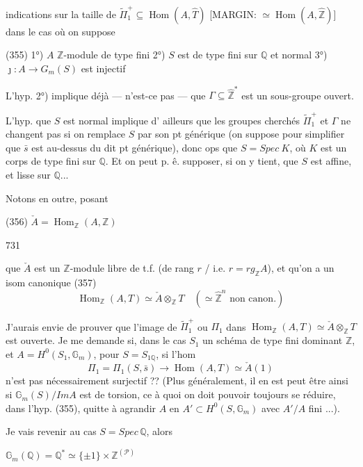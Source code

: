 indications sur la taille de $\tilde{\Pi}_1^+ \subseteq \operatorname{Hom}(A, \hat{T})$
[MARGIN: $\simeq \operatorname{Hom}(A, \hat{\mathbb{Z}})$]
dans le cas où on suppose

(355)
1°) $A$ $\mathbb{Z}$-module de type fini
2°) $S$ est de type fini sur $\mathbb{Q}$ et normal
3°) $\jmath : A \longrightarrow G_m(S)$ est injectif

L'hyp. 2°) implique déjà — n'est-ce pas —
que $\Gamma \subseteq \hat{\mathbb{Z}}^*$ est un sous-groupe ouvert.

L'hyp. que $S$ est normal implique d'
ailleurs que les groupes cherchés
$\tilde{\Pi}_1^+$ et $\Gamma$ ne changent pas si on remplace
$S$ par son pt générique (on suppose
pour simplifier que $\bar{s}$ est au-dessus du
dit pt générique), donc ops que
$S = Spec \ K$, où $K$ est un corps de
type fini sur $\mathbb{Q}$. Et on peut p. ê.
supposer, si on y tient, que $S$
est affine, et lisse sur $\mathbb{Q}$...

Notons en outre, posant

(356) $\check{A} = \operatorname{Hom}_{\mathbb{Z}}(A, \mathbb{Z})$

\newpage


731

que $\check{A}$ est un $\mathbb{Z}$-module libre de t.f.
(de rang $r$ / i.e. $r = rg_{\mathbb{Z}} A$), et qu'on a
un isom canonique
(357) $$ \operatorname{Hom}_{\mathbb{Z}}(A, T) \simeq \check{A} \otimes_{\mathbb{Z}} T \quad (\simeq \hat{\mathbb{Z}}^n \text{ non canon.}) $$

J'aurais envie de prouver que l'image
de $\tilde{\Pi}_1^+$ ou $\Pi_1$ dans $\operatorname{Hom}_{\mathbb{Z}}(A, T) \simeq \check{A} \otimes_{\mathbb{Z}} T$
est ouverte. Je me demande si,
dans le cas $S_1$ un schéma de type fini
dominant $\mathbb{Z}$,
et $A = H^0(S_1, \mathbb{G}_m)$, pour
$S = S_{1\mathbb{Q}}$, si l'hom
$$\Pi_1 = \Pi_1(S, \bar{s}) \to \operatorname{Hom}(A, T) \simeq \check{A}(1)$$
n'est pas nécessairement surjectif ??
(Plus généralement, il en est peut être
ainsi si $\mathbb{G}_m(S) / Im A$ est de
torsion, ce à quoi on doit pouvoir
toujours se réduire, dans l'hyp. (355), quitte
à agrandir $A$ en $A' \subset H^0(S, \mathbb{G}_m)$ avec $A'/A$
fini ...).

\newpage


Je vais revenir au cas $S = Spec \, \mathbb{Q}$, alors

$\mathbb{G}_m(\mathbb{Q}) = \mathbb{Q}^* \simeq \{\pm 1\} \times \mathbb{Z}^{(\mathcal{P})}$

